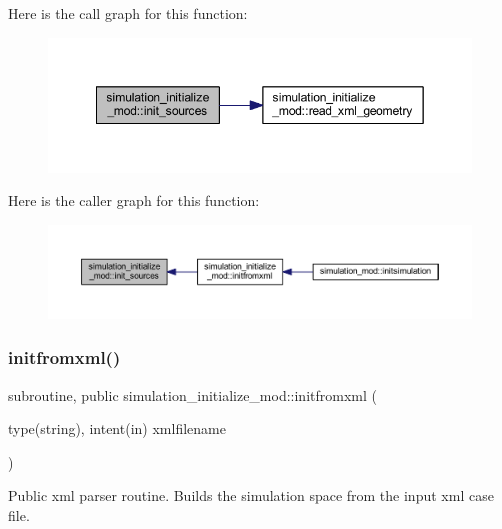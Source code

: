 Here is the call graph for this function\+:\nopagebreak
\begin{figure}[H]
\begin{center}
\leavevmode
\includegraphics[width=349pt]{namespacesimulation__initialize__mod_ae89df4e3074d9624a7db2bc015545d8d_cgraph}
\end{center}
\end{figure}
Here is the caller graph for this function\+:\nopagebreak
\begin{figure}[H]
\begin{center}
\leavevmode
\includegraphics[width=350pt]{namespacesimulation__initialize__mod_ae89df4e3074d9624a7db2bc015545d8d_icgraph}
\end{center}
\end{figure}
\mbox{\label{namespacesimulation__initialize__mod_aa596874d438807298121982eaa129d3a}} 
\subsubsection{\texorpdfstring{initfromxml()}{initfromxml()}}
{\footnotesize\ttfamily subroutine, public simulation\+\_\+initialize\+\_\+mod\+::initfromxml (\begin{DoxyParamCaption}\item[{type(string), intent(in)}]{xmlfilename }\end{DoxyParamCaption})}



Public xml parser routine. Builds the simulation space from the input xml case file. 

